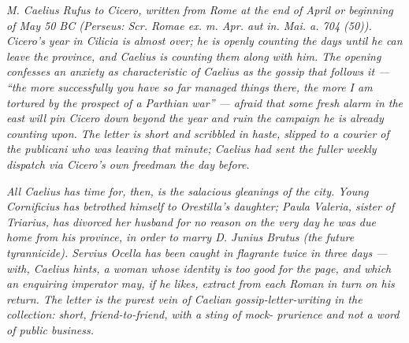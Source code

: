 
\textit{M. Caelius Rufus to Cicero, written from Rome at the
end of April or beginning of May 50 BC (Perseus: \textit{Scr.
Romae ex. m. Apr. aut in. Mai. a. 704 (50)}). Cicero's year
in Cilicia is almost over; he is openly counting the days
until he can leave the province, and Caelius is counting them
along with him. The opening confesses an anxiety as
characteristic of Caelius as the gossip that follows it ---
``the more successfully you have so far managed things
there, the more I am tortured by the prospect of a Parthian
war'' --- afraid that some fresh alarm in the east will pin
Cicero down beyond the year and ruin the campaign he is
already counting upon. The letter is short and scribbled in
haste, slipped to a courier of the publicani who was leaving
that minute; Caelius had sent the fuller weekly dispatch via
Cicero's own freedman the day before.}

\textit{All Caelius has time for, then, is the salacious
gleanings of the city. Young Cornificius has betrothed
himself to Orestilla's daughter; Paula Valeria, sister of
Triarius, has divorced her husband for no reason on the very
day he was due home from his province, in order to marry D.
Junius Brutus (the future tyrannicide). Servius Ocella has
been caught \textit{in flagrante} twice in three days --- with,
Caelius hints, a woman whose identity is too good for the
page, and which an enquiring imperator may, if he likes,
extract from each Roman in turn on his return. The letter is
the purest vein of Caelian gossip-letter-writing in the
collection: short, friend-to-friend, with a sting of mock-
prurience and not a word of public business.}
